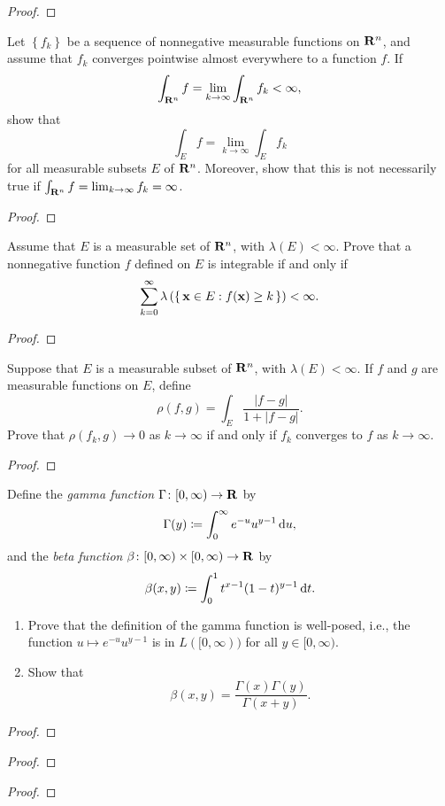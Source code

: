 \begin{proof}
\end{proof}

\begin{problem}
Let $\left\{f_k\right\}$ be a sequence of nonnegative measurable functions
on $\mathbf{R}^n$, and assume that $f_k$ converges pointwise almost everywhere to
a function $f$. If
\[
\int_{\mathbf{R}^n} f=\lim_{k\to\infty}\int_{\mathbf{R}^n} f_k<\infty,
\]
show that
\[
\int_E f=\lim_{k\to\infty}\int_E f_k
\]
for all measurable subsets $E$ of $\mathbf{R}^n$. Moreover, show that this is not
necessarily true if $\int_{\mathbf{R}^n} f=\lim_{k\to\infty} f_k=\infty$.
\end{problem}
\begin{proof}
\end{proof}

\begin{problem}
Assume that $E$ is a measurable set of $\mathbf{R}^n$, with $\lambda(E)<\infty$. Prove
that a nonnegative function $f$ defined on $E$ is integrable if and only if
\[
\sum_{k=0}^\infty\lambda\left(\left\{\,\mathbf{x}\in E:f(\mathbf{x})\geq
    k\,\right\}\right)<\infty.
\]
\end{problem}
\begin{proof}
\end{proof}

\begin{problem}
Suppose that $E$ is a measurable subset of $\mathbf{R}^n$, with
$\lambda(E)<\infty$. If $f$ and $g$ are measurable functions on $E$, define
\[
\rho(f,g)=\int_E\frac{|f-g|}{1+|f-g|}.
\]
Prove that $\rho(f_k,g)\to 0$ as $k\to\infty$ if and only if $f_k$
converges to $f$ as $k\to\infty$.
\end{problem}
\begin{proof}
\end{proof}

\begin{problem}
Define the \emph{gamma function} $\Gamma\colon[0,\infty)\to\mathbf{R}$ by
\[
\Gamma(y)\coloneqq\int_0^\infty e^{-u}u^{y-1}\mathop{}\!\mathrm{d} u,
\]
and the \emph{beta function} $\beta\colon[0,\infty)\times[0,\infty)\to\mathbf{R}$
by
\[
\beta(x,y)\coloneqq\int_0^1 t^{x-1}(1-t)^{y-1}\mathop{}\!\mathrm{d} t.
\]
\begin{enumerate}[label=(\alph*)]
\item Prove that the definition of the gamma function is well-posed, i.e.,
  the function $u\mapsto e^{-u}u^{y-1}$ is in $L([0,\infty))$ for all
  $y\in[0,\infty)$.
\item Show that
\[
\beta(x,y)=\frac{\Gamma(x)\Gamma(y)}{\Gamma(x+y)}.
\]
\end{enumerate}
\end{problem}
\begin{proof}
\end{proof}

\begin{problem}
\end{problem}
\begin{proof}
\end{proof}

\begin{problem}
\end{problem}
\begin{proof}
\end{proof}

